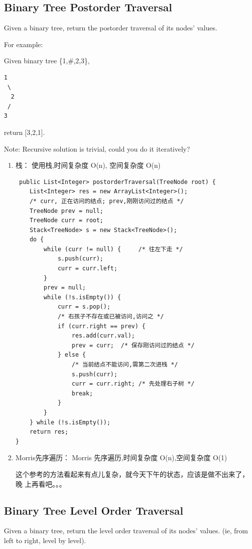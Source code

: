\documentclass[12pt]{book}
\begin{document}
\subsection{Binary Tree Postorder Traversal}
\label{sec-4-2-3}
Given a binary tree, return the postorder traversal of its nodes' values.

For example:

Given binary tree \{1,\#,2,3\},
\lstset{language=java,label= ,caption= ,numbers=none}
\begin{lstlisting}
1
 \
  2
 /
3
\end{lstlisting}

return [3,2,1].

Note: Recursive solution is trivial, could you do it iteratively?
\begin{enumerate}
\item 栈： 使用栈,时间复杂度 O(n), 空间复杂度 O(n)
\label{sec-4-2-3-1}

\lstset{language=java,label= ,caption= ,numbers=none}
\begin{lstlisting}
 public List<Integer> postorderTraversal(TreeNode root) {
    List<Integer> res = new ArrayList<Integer>();
    /* curr, 正在访问的结点; prev,刚刚访问过的结点 */
    TreeNode prev = null; 
    TreeNode curr = root; 
    Stack<TreeNode> s = new Stack<TreeNode>();
    do {
        while (curr != null) {     /* 往左下走 */
            s.push(curr);
            curr = curr.left;
        }
        prev = null;
        while (!s.isEmpty()) {
            curr = s.pop();
            /* 右孩子不存在或已被访问,访问之 */
            if (curr.right == prev) {
                res.add(curr.val);
                prev = curr;  /* 保存刚访问过的结点 */
            } else {
                /* 当前结点不能访问,需第二次进栈 */
                s.push(curr);
                curr = curr.right; /* 先处理右子树 */
                break;
            }
        }
    } while (!s.isEmpty());
    return res;
}
\end{lstlisting}

\item Morris先序遍历： Morris 先序遍历,时间复杂度 O(n),空间复杂度 O(1)
\label{sec-4-2-3-2}

这个参考的方法看起来有点儿复杂，就今天下午的状态，应该是做不出来了，晚
上再看吧。。。
\end{enumerate}

\subsection{Binary Tree Level Order Traversal}
\label{sec-4-2-4}
Given a binary tree, return the level order traversal of its nodes' values. (ie, from left to right, level by level).
\end{document}
